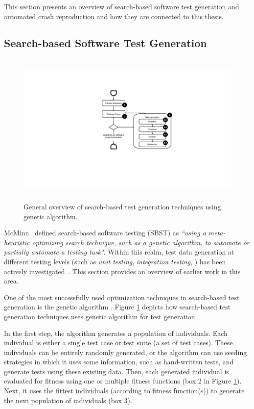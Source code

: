 This section presents an overview of search-based software test generation and automated crash reproduction and how they are connected to this thesis.

\subsection{Search-based Software Test Generation}
\label{sec:background:unit}

\begin{figure}
  \begin{center}
  \includegraphics[height=3in]{figs/sb-test-generation.pdf}
\end{center}
  \caption{General overview of search-based test generation techniques using genetic algorithm.}
  \label{fig:sb-tg}
\end{figure}

McMinn~\cite{McMinn2004} defined search-based software testing (SBST) as \textit{``using a meta-heuristic optimizing search technique, such as a genetic algorithm, to automate or partially automate a testing task"}.
Within this realm, test data generation at different testing levels (such as \textit{unit testing}, \textit{integration testing}, \etc) has been actively investigated~\cite{McMinn2004}. This section 
provides an overview of earlier work in this area.

One of the most successfully used optimization techniques in search-based test generation is the genetic algorithm \cite{McMinn2011}. Figure \ref{fig:sb-tg} depicts how search-based test generation techniques uses genetic algorithm for test generation. 

In the first step, the algorithm generates a population of individuals. Each individual is either a single test case or test suite (a set of test cases). These individuals can be entirely randomly generated, or the algorithm can use seeding strategies in which it uses some information, such as hand-written tests, and generate tests using these existing data. Then, each generated individual is evaluated for fitness using one or multiple fitness functions (box 2 in Figure \ref{fig:sb-tg}). Next, it uses the fittest individuals (according to fitness function(s)) to generate the next population of individuals (box 3). 


